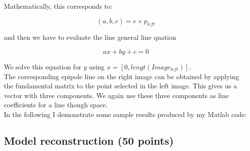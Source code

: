 \documentclass{paper}
\begin{document}
Mathematically, this corresponds to:

\begin{equation}
    (a,b,c) = e \times p_{left}
\end{equation}

and then we have to evaluate the line general line quation 

\begin{equation}
    ax + by + c = 0
\end{equation}

We solve this equation for $y$ using $x = [0,lengt(Image_{left})]$. \\

The corresponding epipole line on the right image can be obtained by applying the fundamental matrix to the point selected in the left image. This gives us a vector with three components. We again use these three components as line coefficients for a line though space. \\

In the following I demonstrate some sample results produced by my Matlab code:






 




\subsection{Model reconstruction (50 points)}
\end{document}
